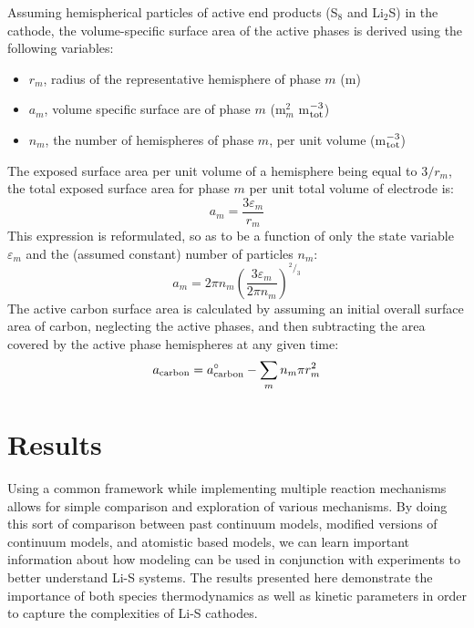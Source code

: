 \documentclass{elsarticle}
\begin{document}
Assuming hemispherical particles of active end products (S$_8$ and Li$_2$S) in the cathode, the volume-specific surface area of the active phases is derived using the following variables:
\begin{itemize}
    \item $r_m$, radius of the representative hemisphere of phase $m$ (m)
    \item $a_m$, volume specific surface are of phase $m$ (m$^2_m$ m$^{-3}_{\rm tot}$)
    \item $n_m$, the number of hemispheres of phase $m$, per unit volume (m$^{-3}_{\rm tot}$)
\end{itemize}
The exposed surface area per unit volume of a hemisphere being equal to $3/r_m$, the total exposed surface area for phase $m$ per unit total volume of electrode is:
\begin{equation}\label{eq:area_per_vol_m_1}
    a_m = \frac{3\varepsilon_m}{r_m}
\end{equation}
This expression is reformulated, so as to be a function of only the state variable $\varepsilon_m$ and the (assumed constant) number of particles $n_m$:
\begin{equation}\label{eq:area_per_vol_m_2}
    a_m = 2\pi n_m\left(\frac{3\varepsilon_m}{2\pi n_m}\right)^{^2/_3}
\end{equation}
The active carbon surface area is calculated by assuming an initial overall surface area of carbon, neglecting the active phases, and then subtracting the area covered by the active phase hemispheres at any given time:
\begin{equation}\label{eq:a_carbon}
    a_{\rm carbon} = a^\circ_{\rm carbon} - \sum_m n_m\pi r_m^2
\end{equation}





\section{Results}

Using a common framework while implementing multiple reaction mechanisms allows for simple comparison and exploration of various mechanisms. By doing this sort of comparison between past continuum models, modified versions of continuum models, and atomistic based models, we can learn important information about how modeling can be used in conjunction with experiments to better understand Li-S systems. The results presented here demonstrate the importance of both species thermodynamics as well as kinetic parameters in order to capture the complexities of Li-S cathodes. 
\end{document}
